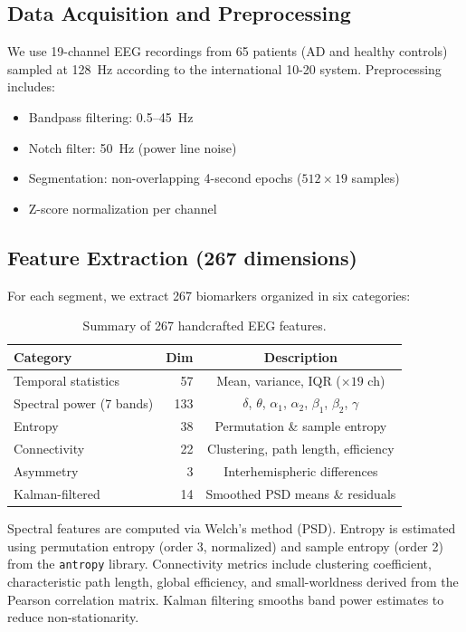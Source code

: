 \documentclass[twocolumn,11pt]{article}
\begin{document}
\subsection{Data Acquisition and Preprocessing}

We use 19-channel EEG recordings from 65 patients (AD and healthy controls) sampled at 128~Hz according to the international 10-20 system. Preprocessing includes:
\begin{itemize}[nosep]
  \item Bandpass filtering: 0.5--45~Hz
  \item Notch filter: 50~Hz (power line noise)
  \item Segmentation: non-overlapping 4-second epochs ($512 \times 19$ samples)
  \item Z-score normalization per channel
\end{itemize}

\subsection{Feature Extraction (267 dimensions)}

For each segment, we extract 267 biomarkers organized in six categories:

\begin{table}[H]
\centering
\small
\caption{Summary of 267 handcrafted EEG features.}
\label{tab:features}
\begin{tabular}{@{}lrc@{}}
\toprule
\textbf{Category} & \textbf{Dim} & \textbf{Description} \\
\midrule
Temporal statistics   & 57  & Mean, variance, IQR ($\times 19$ ch) \\
Spectral power (7 bands) & 133 & $\delta$, $\theta$, $\alpha_1$, $\alpha_2$, $\beta_1$, $\beta_2$, $\gamma$ \\
Entropy               & 38  & Permutation \& sample entropy \\
Connectivity           & 22  & Clustering, path length, efficiency \\
Asymmetry              & 3   & Interhemispheric differences \\
Kalman-filtered        & 14  & Smoothed PSD means \& residuals \\
\bottomrule
\end{tabular}
\end{table}

Spectral features are computed via Welch's method (PSD). Entropy is estimated using permutation entropy (order 3, normalized) and sample entropy (order 2) from the \texttt{antropy} library. Connectivity metrics include clustering coefficient, characteristic path length, global efficiency, and small-worldness derived from the Pearson correlation matrix. Kalman filtering smooths band power estimates to reduce non-stationarity.
\end{document}

